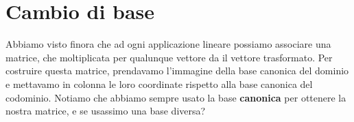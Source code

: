 \documentclass{report}
\begin{document}
\section{Cambio di base}
Abbiamo visto finora che ad ogni applicazione lineare possiamo associare una matrice, che moltiplicata per qualunque vettore da il vettore trasformato. Per costruire questa matrice, prendavamo l'immagine della base canonica del dominio e mettavamo in colonna le loro coordinate rispetto alla base canonica del codominio. Notiamo che abbiamo sempre usato la base \textbf{canonica} per ottenere la nostra matrice, e se usassimo una base diversa?
\end{document}
